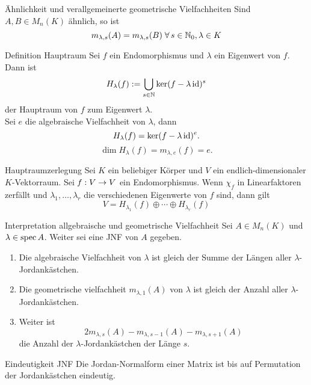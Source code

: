 \documentclass[main.tex]{subfiles}
\begin{document}
\begin{karte}{Ähnlichkeit und verallgemeinerte geometrische Vielfachheiten}
    Sind \(A, B \in M_n(K)\) ähnlich, so ist
    \[ m_{\lambda, s}(A) = m_{\lambda, s}(B) \; \forall s \in \N_0, \lambda \in K \]
\end{karte}

\begin{karte}{Definition Hauptraum}
    Sei \(f\) ein Endomorphismus und \(\lambda\) ein Eigenwert von \(f\). Dann ist
    \[ H_\lambda(f) := \bigcup_{s \in \mathbb{N}} \ker (f-\lambda \operatorname{id})^s \]
    der Hauptraum von \(f\) zum Eigenwert \(\lambda\).\\
    Sei \(e\) die algebraische Vielfachheit von \(\lambda\), dann
    \[ H_\lambda(f) = \ker(f-\lambda\operatorname{id})^e. \]
    \[ \dim H_\lambda(f) = m_{\lambda, e}(f) = e. \]
\end{karte}

\begin{karte}{Hauptraumzerlegung}
    Sei \(K\) ein beliebiger Körper und \(V\) ein endlich-dimensionaler \(K\)-Vektorraum.
    Sei \(f : V \rightarrow V\) ein Endomorphismus. Wenn \(\chi_f\) in Linearfaktoren
    zerfällt und \(\lambda_1, \ldots, \lambda_r\) die verschiedenen Eigenwerte
    von \(f\) sind, dann gilt
    \[ V = H_{\lambda_1}(f) \oplus \cdots \oplus H_{\lambda_r}(f) \]
\end{karte}

\begin{karte}{Interpretation allgebraische und geometrische Vielfachheit}
    Sei \(A \in M_n(K)\) und \(\lambda \in \operatorname{spec} A\). Weiter sei eine JNF von \(A\)
    gegeben.
    \begin{enumerate}
        \item Die algebraische Vielfachheit von \(\lambda\) ist gleich der Summe der
        Längen aller \(\lambda\)-Jordankästchen.
        \item Die geometrische vielfachheit \(m_{\lambda,1}(A)\) von \(\lambda\) ist
        gleich der Anzahl aller \(\lambda\)-Jordankästchen.
        \item Weiter ist
        \[ 2m_{\lambda, s}(A)-m_{\lambda, s-1}(A) - m_{\lambda,s+1}(A) \]
        die Anzahl der \(\lambda\)-Jordankästchen der Länge \(s\).
    \end{enumerate}
\end{karte}

\begin{karte}{Eindeutigkeit JNF}
    Die Jordan-Normalform einer Matrix ist bis auf Permutation der Jordankästchen eindeutig.
\end{karte}
\end{document}
